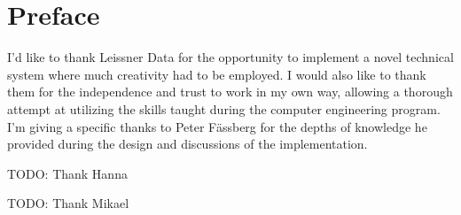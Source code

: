 \thispagestyle{plain}

\section*{Preface}

I'd like to thank Leissner Data for the opportunity to implement a
novel technical system where much creativity had to be employed. I
would also like to thank them for the independence and trust to
work in my own way, allowing a thorough attempt at utilizing the
skills taught during the computer engineering program. I'm giving a
specific thanks to Peter Fässberg for the depths of knowledge he
provided during the design and discussions of the implementation.

TODO: Thank Hanna

TODO: Thank Mikael
